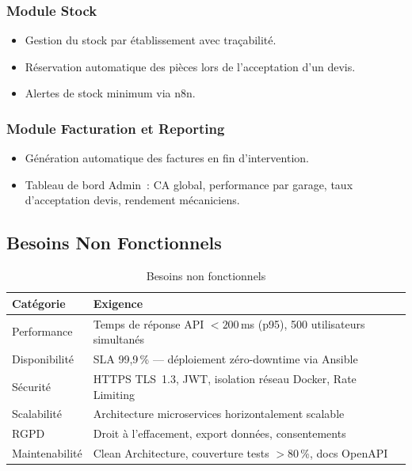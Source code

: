 \documentclass[12pt,a4paper]{report}
\begin{document}
\subsubsection{Module Stock}
\begin{itemize}
  \item Gestion du stock par \'{e}tablissement avec tra\c{c}abilit\'{e}.
  \item R\'{e}servation automatique des pi\`{e}ces lors de l'acceptation
    d'un devis.
  \item Alertes de stock minimum via n8n.
\end{itemize}

\subsubsection{Module Facturation et Reporting}
\begin{itemize}
  \item G\'{e}n\'{e}ration automatique des factures en fin d'intervention.
  \item Tableau de bord Admin~: CA global, performance par garage,
    taux d'acceptation devis, rendement m\'{e}caniciens.
\end{itemize}

\subsection{Besoins Non Fonctionnels}

\begin{table}[H]
\centering
\caption{Besoins non fonctionnels}
\renewcommand{\arraystretch}{1.3}
\begin{tabularx}{\textwidth}{|l|X|}
\hline
\rowcolor{primary!20}
\textbf{Cat\'{e}gorie} & \textbf{Exigence} \\
\hline
Performance & Temps de r\'{e}ponse API $<200$\,ms (p95),
  500 utilisateurs simultan\'{e}s \\
\hline
Disponibilit\'{e} & SLA 99,9\,\% --- d\'{e}ploiement z\'{e}ro-downtime
  via Ansible \\
\hline
S\'{e}curit\'{e} & HTTPS TLS~1.3, JWT, isolation r\'{e}seau Docker,
  Rate Limiting \\
\hline
Scalabilit\'{e} & Architecture microservices horizontalement scalable \\
\hline
RGPD & Droit \`{a} l'effacement, export donn\'{e}es, consentements \\
\hline
Maintenabilit\'{e} & Clean Architecture, couverture tests $>80$\,\%,
  docs OpenAPI \\
\hline
\end{tabularx}
\end{table}
\end{document}
